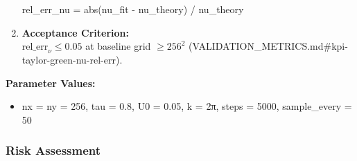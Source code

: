 \documentclass[
]{article}
\newenvironment{Shaded}{}{}
\newcommand{\BuiltInTok}[1]{\textcolor[rgb]{0.00,0.50,0.00}{#1}}
\newcommand{\NormalTok}[1]{#1}
\newcommand{\OperatorTok}[1]{\textcolor[rgb]{0.40,0.40,0.40}{#1}}
\providecommand{\tightlist}{%
  \setlength{\itemsep}{0pt}\setlength{\parskip}{0pt}}
\begin{document}
\begin{enumerate}
\begin{Shaded}
\begin{Highlighting}[]
\NormalTok{rel\_err\_nu }\OperatorTok{=} \BuiltInTok{abs}\NormalTok{(nu\_fit }\OperatorTok{{-}}\NormalTok{ nu\_theory) }\OperatorTok{/}\NormalTok{ nu\_theory}
\end{Highlighting}
\end{Shaded}
\item
  \textbf{Acceptance Criterion:}\\
  \(\mathrm{rel\_err}_{\nu} \le 0.05\) at baseline grid \(\ge 256^{2}\)
  (VALIDATION\_METRICS.md\#kpi-taylor-green-nu-rel-err).
\end{enumerate}

\textbf{Parameter Values:}

\begin{itemize}
\tightlist
\item
  nx = ny = 256, tau = 0.8, U0 = 0.05, k = 2π, steps = 5000,
  sample\_every = 50
\end{itemize}

\hypertarget{risk-assessment}{%
\subsubsection{Risk Assessment}\label{risk-assessment}}
\end{document}
